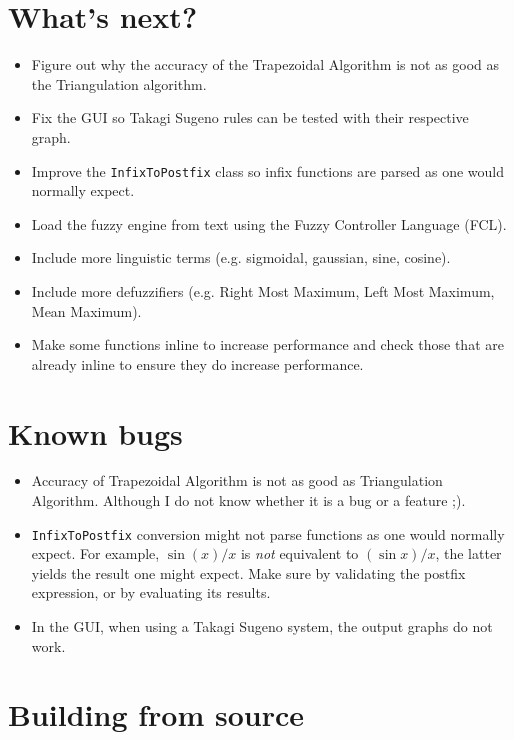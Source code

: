 \section{What's next?}
	\begin{itemize}
	  \item Figure out why the accuracy of the Trapezoidal Algorithm is not as good
	  as the Triangulation algorithm.
		\item Fix the GUI so Takagi Sugeno rules can be tested with their respective graph.
		\item Improve the \texttt{InfixToPostfix} class so infix functions are parsed as one would normally expect.
		\item Load the fuzzy engine from text using the Fuzzy Controller Language (FCL).
		\item Include more linguistic terms (e.g. sigmoidal, gaussian, sine, cosine).
		\item Include more defuzzifiers (e.g. Right Most Maximum, Left Most Maximum, Mean Maximum).
		\item Make some functions inline to increase performance and check those that are already inline to ensure they do increase performance.
	\end{itemize}
	
	\section{Known bugs}
	\begin{itemize}
	  \item Accuracy of Trapezoidal Algorithm is not as good as Triangulation
	  Algorithm. Although I do not know whether it is a bug or a feature ;).
		\item \texttt{InfixToPostfix} conversion might not parse functions as one would normally expect. For example, $\sin (x) / x$ is \emph{not} equivalent to $(\sin x) / x$, the latter yields the result one might expect. Make sure by validating the postfix expression, or by evaluating its results.
		\item In the GUI, when using a Takagi Sugeno system, the output graphs do not work.
	\end{itemize}
	
\section{Building from source}

